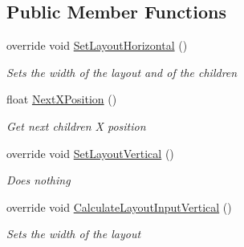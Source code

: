 \subsection*{Public Member Functions}
\begin{DoxyCompactItemize}
\item 
override void \hyperlink{class_simple_horizontal_layout_a2001b1a1883166a444d7e68adfc48134}{Set\+Layout\+Horizontal} ()
\begin{DoxyCompactList}\small\item\em Sets the width of the layout and of the children \end{DoxyCompactList}\item 
float \hyperlink{class_simple_horizontal_layout_a403b4af594efdeb489c640f644de4f93}{Next\+X\+Position} ()
\begin{DoxyCompactList}\small\item\em Get next children X position \end{DoxyCompactList}\item 
override void \hyperlink{class_simple_horizontal_layout_ae09e6c347baf860b63cb9ab1f42d3d95}{Set\+Layout\+Vertical} ()
\begin{DoxyCompactList}\small\item\em Does nothing \end{DoxyCompactList}\item 
override void \hyperlink{class_simple_horizontal_layout_a1c2204c6555314295d51ce633ed08b09}{Calculate\+Layout\+Input\+Vertical} ()
\begin{DoxyCompactList}\small\item\em Sets the width of the layout \end{DoxyCompactList}\end{DoxyCompactItemize}
